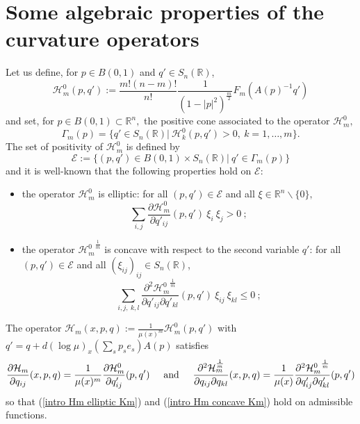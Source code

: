 \documentclass[10pt,reqno,oneside]{amsart}
\theoremstyle{definition}
\theoremstyle{remark}
\newcommand{\R}{\mathbb{R}}
\begin{document}
\section{Some algebraic properties of the curvature operators}\label{appendix properties Hm}
Let us define, for $p\in B(0,1)$ and $q'\in S_n(\R)$,
$$\mathcal{H}_m^0(p,q'):=\frac{m!(n-m)!}{n!}\frac{1}{(1-|p|^2)^{\frac{m}{2}}}F_m(A(p)^{-1}q')$$
and set, for $p\in B(0,1)\subset\R^n,$ the positive cone associated to the operator $\mathcal{H}_m^0,$
$$\Gamma_m(p)=\{q'\in S_n(\R)|\ \mathcal{H}_k^0(p,q')>0,\ k=1,\ldots,m\}.$$
The set of positivity of $\mathcal{H}_m^0$  is defined by
$$\mathcal{E}:=\{(p,q')\in B(0,1)\times S_n(\R)|\ q'\in\Gamma_m(p)\}$$
and it is well-known that the following properties hold on $\mathcal{E}$:
\begin{itemize}
\item the operator $\mathcal{H}_m^0$ is elliptic: for all $(p,q')\in\mathcal{E}$ and all $\xi\in\R^n\backslash\{0\},$
\begin{equation*}
\sum_{i,j}\frac{\partial\mathcal{H}_m^0}{\partial q'_{ij}}(p,q')\ \xi_i\ \xi_j>0\ ;
\end{equation*}
\item the operator ${\mathcal{H}_m^0}^{\frac{1}{m}}$ is concave with respect to the second variable $q'$: for all $(p,q')\in\mathcal{E}$ and all $(\xi_{ij})_{ij}\in S_n(\R)$, 
\begin{equation*}
\sum_{i,j,\ k,l}\frac{\partial^2{\mathcal{H}_m^0}^{\frac{1}{m}}}{\partial q'_{ij}\partial q'_{kl}}(p,q')\ \xi_{ij}\ \xi_{kl}\leq 0\ ;
\end{equation*}
\end{itemize}
The operator $\mathcal{H}_m(x,p,q):=\frac{1}{\mu(x)^m}\mathcal{H}_m^0(p,q')$ with $q'=q+d(\log\mu)_x(\sum_sp_se_s)A(p)$ satisfies
$$\frac{\partial\mathcal{H}_m}{\partial q_{ij}}(x,p,q)=\frac{1}{\mu(x)^m}\frac{\partial\mathcal{H}_m^0}{\partial q'_{ij}}(p,q')\hspace{.5cm}\mbox{and}\hspace{.5cm}\frac{\partial^2\mathcal{H}_m^{\frac{1}{m}}}{\partial q_{ij}\partial q_{kl}}(x,p,q)=\frac{1}{\mu(x)}\frac{\partial^2{\mathcal{H}_m^0}^{\frac{1}{m}}}{\partial q'_{ij}\partial q'_{kl}}(p,q')$$ 
so that (\ref{intro Hm elliptic Km}) and (\ref{intro Hm concave Km}) hold on admissible functions.
\end{document}

